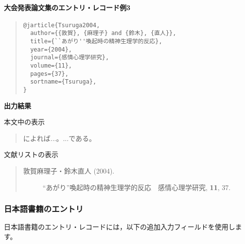 \documentclass[12pt]{ltjsarticle}
\begin{document}
\paragraph{大会発表論文集のエントリ・レコード例3}

\begin{quote}
\begin{verbatim}
@jarticle{Tsuruga2004,
  author={{敦賀}, {麻理子} and {鈴木}, {直人}},
  title={``あがり''喚起時の精神生理学的反応},
  year={2004},
  journal={感情心理学研究},
  volume={11},
  pages={37},
  sortname={Tsuruga},
}
\end{verbatim}
\end{quote}


\textbf{出力結果}

本文中の表示
\begin{quote}
\textcite{Kugihara2003}によれば...。...である\parencite{Kugihara2003}。
\end{quote}


文献リストの表示
\begin{quote}
\begin{description}
  \item[\textrm{敦賀麻理子・鈴木直人 (2004).}]``あがり''喚起時の精神生理学的反応　感情心理学研究, \textbf{11}, 37.
\end{description}
\end{quote}

\subsubsection{日本語書籍のエントリ}

日本語書籍のエントリ・レコードには，以下の追加入力フィールドを使用します。
\end{document}
